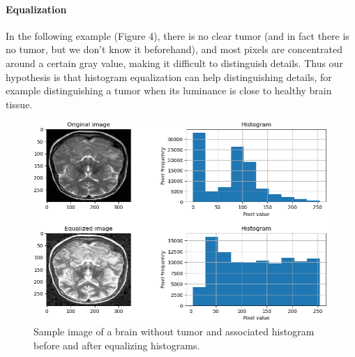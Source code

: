 \documentclass[conference]{IEEEtran}
\begin{document}
\paragraph*{Equalization}
In the following example (Figure 4), there is no clear tumor (and in fact there is no tumor, but we don't know it beforehand), and most pixels are concentrated around a certain gray value, making it difficult to distinguish details. Thus our hypothesis is that histogram equalization can help distinguishing details, for example distinguishing a tumor when its luminance is close to healthy brain tissue.
\begin{figure}[h]
\centering
\includegraphics[scale=0.33]{figures/Equalizing.png}
\caption{Sample image of a brain without tumor and associated histogram before and after equalizing histograms.}
\end{figure}
\end{document}
